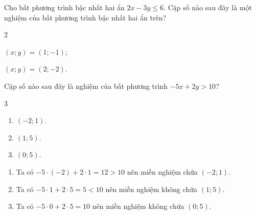 \begin{bt}%
	Cho bất phương trình bậc nhất hai ẩn $2x-3y \leq 6$. Cặp số nào sau đây là một nghiệm của bất phương trình bậc nhất hai ẩn trên?
	\begin{enumEX}{2}
		\item $(x;y)=(1;-1)$;
		\item $(x;y)=(2;-2)$.
	\end{enumEX}
\end{bt}

\begin{bt}%
	Cặp số nào sau đây là nghiệm của bất phương trình $-5x+2y>10$?
	\begin{multicols}{3}
		\begin{enumerate}
		\item $(-2;1)$.
		\item $(1;5)$.
		\item $(0;5)$.
	\end{enumerate}
	\end{multicols}
	\loigiai
	{
		\begin{enumerate}
			\item Ta có $-5\cdot(-2)+2\cdot 1=12>10$ nên miền nghiệm chứa $(-2;1)$.
			\item Ta có $-5\cdot1+2\cdot 5=5<10$ nên miền nghiệm không chứa $(1;5)$.
			\item Ta có $-5\cdot0+2\cdot 5=10$ nên miền nghiệm không chứa $(0;5)$.
		\end{enumerate}
	}
\end{bt}

